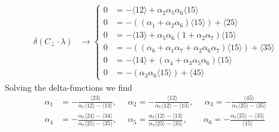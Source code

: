 \documentclass[letter,11pt]{article}
\newcommand{\ab}[1]{\langle #1 \rangle}
\begin{document}
\begin{equation}
	\begin{aligned}
		\delta(C_\perp\cdot \lambda)&\rightarrow\begin{cases}
	0&=-\langle 1 2 \rangle + \alpha_{2} \alpha_{5} \alpha_{6} \langle 1 5 \rangle
		\\
		0&=-((\alpha_{1} + \alpha_{2} \alpha_{6}) \langle 1 5 \rangle) + \langle 2 5 \rangle
		\\
		0&=-\langle 1 3 \rangle + \alpha_{5} \alpha_{6} (1 + \alpha_{2} \alpha_{7}) \langle 1 5 \rangle
		\\
		0&=-((\alpha_{6} + \alpha_{1} \alpha_{7} + \alpha_{2} \alpha_{6} \alpha_{7}) \langle 1 5 \rangle) + \langle 3 5 \rangle
		\\
		0&=-\langle 1 4 \rangle + (\alpha_{4} + \alpha_{3} \alpha_{5} \alpha_{6}) \langle 1 5 \rangle
		\\
		0&=-(\alpha_{3} \alpha_{6} \langle 1 5 \rangle) + \langle 4 5 \rangle
		\end{cases}
	\end{aligned}
\end{equation}
%
%
%
%
%
%
%
%
%
%
%
%
Solving the delta-functions we find
\begin{equation}
	\begin{aligned}
\alpha_1&=-\frac{\ab{23}}{\alpha_7\ab{12}-\ab{13}},~~~~~~
\alpha_2=-\frac{\ab{12}}{\alpha_7\ab{12}-\ab{13}},~~~~~~
\alpha_3=-\frac{\ab{45}}{\alpha_7\ab{25}-\ab{35}}\\
\alpha_4&=-\frac{\alpha_7\ab{24}-\ab{34}}{\alpha_7\ab{25}-\ab{35}}
,~~~~~~
\alpha_5=\frac{\alpha_7\ab{12}-\ab{13}}{\alpha_7\ab{25}-\ab{35}}
,~~~~~~~~\,
\alpha_6=-\frac{\alpha_7\ab{25}-\ab{35}}{\ab{15}}
	\end{aligned}
\end{equation}
\end{document}
